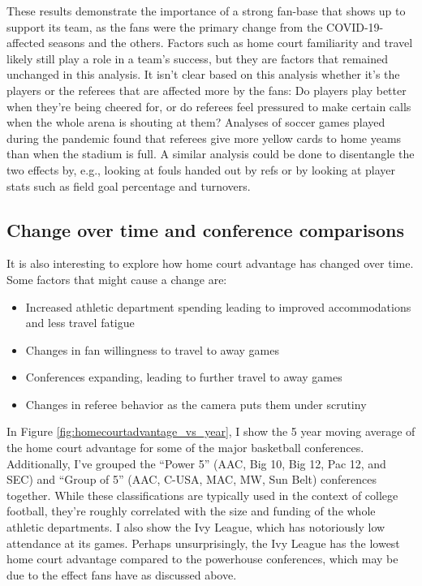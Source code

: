 \documentclass[twocolumn]{aastex63}
\begin{document}
These results demonstrate the importance of a strong fan-base that shows up to support its team, as the fans were the primary change from the COVID-19-affected seasons and the others.
Factors such as home court familiarity and travel likely still play a role in a team's success, but they are factors that remained unchanged in this analysis.
It isn't clear based on this analysis whether it's the players or the referees that are affected more by the fans: Do players play better when they're being cheered for, or do referees feel pressured to make certain calls when the whole arena is shouting at them?
Analyses of soccer games played during the pandemic found that referees give more yellow cards to home yeams than when the stadium is full.
A similar analysis could be done to disentangle the two effects by, e.g., looking at fouls handed out by refs or by looking at player stats such as field goal percentage and turnovers.

\subsection{Change over time and conference comparisons}
It is also interesting to explore how home court advantage has changed over time. 
Some factors that might cause a change are:
\begin{itemize}
\item Increased athletic department spending leading to improved accommodations and less travel fatigue
\item Changes in fan willingness to travel to away games
\item Conferences expanding, leading to further travel to away games
\item Changes in referee behavior as the camera puts them under scrutiny
\end{itemize}
In Figure \ref{fig:homecourtadvantage_vs_year}, I show the 5 year moving average of the home court advantage for some of the major basketball conferences.
Additionally, I've grouped the ``Power 5'' (AAC, Big 10, Big 12, Pac 12, and SEC) and ``Group of 5'' (AAC, C-USA, MAC, MW, Sun Belt) conferences together.
While these classifications are typically used in the context of college football, they're roughly correlated with the size and funding of the whole athletic departments.
I also show the Ivy League, which has notoriously low attendance at its games.
Perhaps unsurprisingly, the Ivy League has the lowest home court advantage compared to the powerhouse conferences, which may be due to the effect fans have as discussed above.
\end{document}
